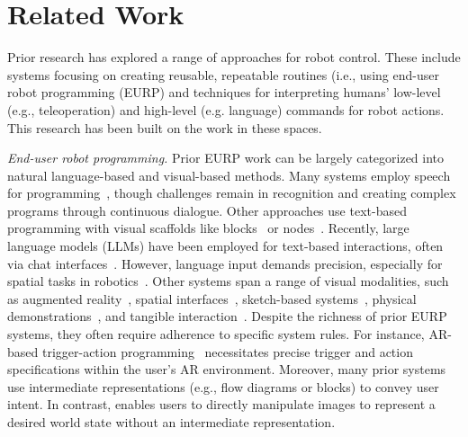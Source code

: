 \section{Related Work}
Prior research has explored a range of approaches for robot control.
These include systems focusing on creating reusable, repeatable routines (i.e., using end-user robot programming (EURP) and techniques for interpreting humans' low-level (e.g., teleoperation) and high-level (e.g. language) commands for robot actions.
This research has been built on the work in these spaces.

\noindent \emph{End-user robot programming.} Prior EURP work can be largely categorized into natural language-based and visual-based methods. Many systems employ speech for programming~\cite{cakmak2014teaching, gorostiza2011end}, though challenges remain in recognition and creating complex programs through continuous dialogue. Other approaches use text-based programming with visual scaffolds like blocks~\cite{huang2017code3, huang2016design, weintrop2018evaluating} or nodes~\cite{alexandrova2015roboflow,porfirio2018authoring}. Recently, large language models (LLMs) have been employed for text-based interactions, often via chat interfaces~\cite{karli2024alchemist, ge2024cocobo}. However, language input demands precision, especially for spatial tasks in robotics~\cite{masson2024directgpt, sundaresan2024rt}. Other systems span a range of visual modalities, such as augmented reality~\cite{ikeda2024programar, suzuki2022augmented, quintero2018robot, gong2019projection, cao2019ghostar}, spatial interfaces~\cite{huang2020vipo, cao2019v, mahadevan2022mimic}, sketch-based systems~\cite{sakamoto2009sketch, porfirio2023sketching}, physical demonstrations~\cite{akgun2012trajectories}, and tangible interaction~\cite{sefidgar2017situated, gao2019pati}. Despite the richness of prior EURP systems, they often require adherence to specific system rules. For instance, AR-based trigger-action programming~\cite{ikeda2024programar} necessitates precise trigger and action specifications within the user's AR environment. Moreover, many prior systems use intermediate representations (e.g., flow diagrams or blocks) to convey user intent. In contrast, \projname enables users to directly manipulate images to represent a desired world state without an intermediate representation.



